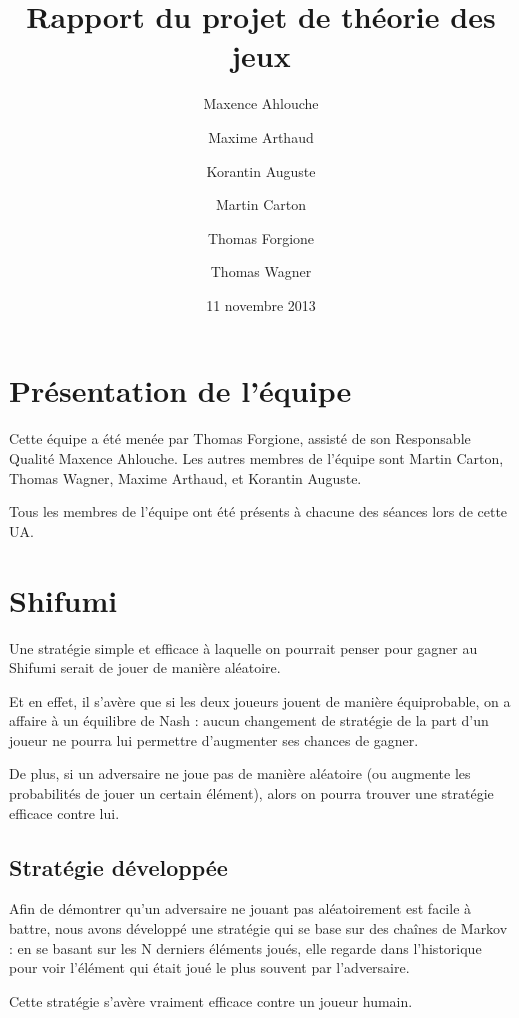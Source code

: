 \documentclass{scrartcl}
\begin{document}
\title{Rapport du projet de théorie des jeux}
\author{Maxence Ahlouche \and Maxime Arthaud \and Korantin Auguste
          \and Martin Carton \and Thomas Forgione \and Thomas Wagner}
\date{11 novembre 2013}
\maketitle
\tableofcontents
\lstlistoflistings
\newpage

\section{Présentation de l'équipe}
  Cette équipe a été menée par Thomas Forgione, assisté de son Responsable
  Qualité Maxence Ahlouche. Les autres membres de l'équipe sont Martin Carton,
  Thomas Wagner, Maxime Arthaud, et Korantin Auguste.

  Tous les membres de l'équipe ont été présents à chacune des séances lors de
  cette UA.

\section{Shifumi}

    Une stratégie simple et efficace à laquelle on pourrait penser pour gagner
    au Shifumi serait de jouer de manière aléatoire.

    Et en effet, il s'avère que si les deux joueurs jouent de manière équiprobable,
    on a affaire à un équilibre de Nash : aucun changement de stratégie de la part
    d'un joueur ne pourra lui permettre d'augmenter ses chances de gagner.

    De plus, si un adversaire ne joue pas de manière aléatoire (ou augmente les probabilités
    de jouer un certain élément), alors on pourra trouver une stratégie efficace contre lui.

    \subsection{Stratégie développée}

    Afin de démontrer qu'un adversaire ne jouant pas aléatoirement est facile
    à battre, nous avons développé une stratégie qui se base sur des chaînes
    de Markov : en se basant sur les N derniers éléments joués, elle regarde
    dans l'historique pour voir l'élément qui était joué le plus souvent par
    l'adversaire.

    Cette stratégie s'avère vraiment efficace contre un joueur humain.
\end{document}
